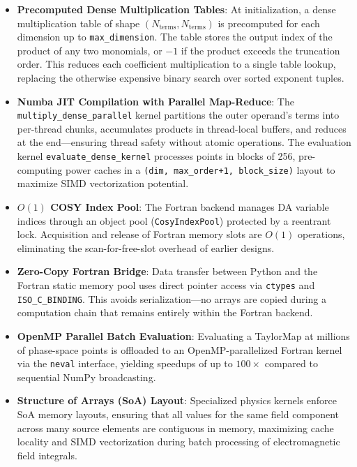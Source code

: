 \documentclass[aps,prb,reprint,superscriptaddress,nofootinbib]{revtex4-2}
\begin{document}
\begin{itemize}
    \item \textbf{Precomputed Dense Multiplication Tables}: At initialization, a dense multiplication table of shape $(N_{\text{terms}}, N_{\text{terms}})$ is precomputed for each dimension up to \texttt{max\_dimension}. The table stores the output index of the product of any two monomials, or $-1$ if the product exceeds the truncation order. This reduces each coefficient multiplication to a single table lookup, replacing the otherwise expensive binary search over sorted exponent tuples.

    \item \textbf{Numba JIT Compilation with Parallel Map-Reduce}: The \texttt{multiply\_dense\_parallel} kernel partitions the outer operand's terms into per-thread chunks, accumulates products in thread-local buffers, and reduces at the end---ensuring thread safety without atomic operations. The evaluation kernel \texttt{evaluate\_dense\_kernel} processes points in blocks of 256, pre-computing power caches in a \texttt{(dim, max\_order+1, block\_size)} layout to maximize SIMD vectorization potential.

    \item \textbf{$O(1)$ COSY Index Pool}: The Fortran backend manages DA variable indices through an object pool (\texttt{CosyIndexPool}) protected by a reentrant lock. Acquisition and release of Fortran memory slots are $O(1)$ operations, eliminating the scan-for-free-slot overhead of earlier designs.

    \item \textbf{Zero-Copy Fortran Bridge}: Data transfer between Python and the Fortran static memory pool uses direct pointer access via \texttt{ctypes} and \texttt{ISO\_C\_BINDING}. This avoids serialization---no arrays are copied during a computation chain that remains entirely within the Fortran backend.

    \item \textbf{OpenMP Parallel Batch Evaluation}: Evaluating a TaylorMap at millions of phase-space points is offloaded to an OpenMP-parallelized Fortran kernel via the \texttt{neval} interface, yielding speedups of up to $100\times$ compared to sequential NumPy broadcasting.

    \item \textbf{Structure of Arrays (SoA) Layout}: Specialized physics kernels enforce SoA memory layouts, ensuring that all values for the same field component across many source elements are contiguous in memory, maximizing cache locality and SIMD vectorization during batch processing of electromagnetic field integrals.
\end{itemize}
\end{document}
